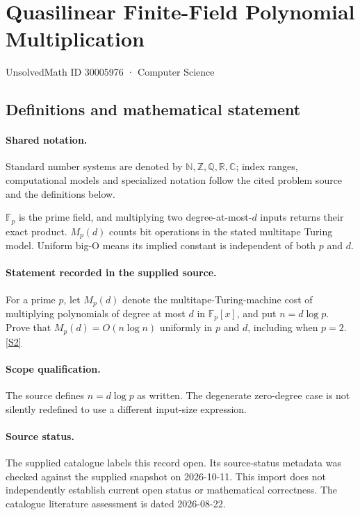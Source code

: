 \documentclass[11pt]{article}
\newcommand{\sref}[2]{\hyperlink{source:#1:#2}{[S#2]}}
\begin{document}
\setcounter{section}{30005975}
\section{Quasilinear Finite-Field Polynomial Multiplication}\label{30005976}
{\small\sffamily UnsolvedMath ID 30005976 · Computer Science}
\subsection{Definitions and mathematical statement}

\paragraph{Shared notation.}Standard number systems are denoted by $\mathbb N,\mathbb Z,\mathbb Q,\mathbb R,\mathbb C$; index ranges, computational models and specialized notation follow the cited problem source and the definitions below.


$\mathbb F_p$ is the prime field, and multiplying two degree-at-most-$d$ inputs returns their exact product. $M_p(d)$ counts bit operations in the stated multitape Turing model. Uniform big-O means its implied constant is independent of both $p$ and $d$.
\paragraph{Statement recorded in the supplied source.}
For a prime $p$, let $M_p(d)$ denote the multitape-Turing-machine cost of multiplying polynomials of degree at most $d$ in $\mathbb{F}_p[x]$, and put $n=d\log p$. Prove that $M_p(d)=O(n\log n)$ uniformly in $p$ and $d$, including when $p=2$. \sref{30005976}{2}
\paragraph{Scope qualification.}
The source defines $n=d\log p$ as written. The degenerate zero-degree case is not silently redefined to use a different input-size expression.
\paragraph{Source status.}
The supplied catalogue labels this record open. Its source-status metadata was checked against the supplied snapshot on 2026-10-11. This import does not independently establish current open status or mathematical correctness. The catalogue literature assessment is dated 2026-08-22.
\end{document}
